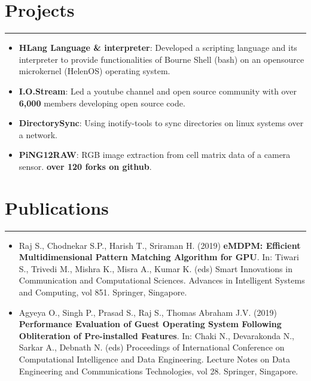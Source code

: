 \documentclass[a4paper,6pt]{article}
\begin{document}
\vspace{-9px}
\section*{Projects}
\vspace{-8px}
\hrule
\vspace{4px}
\hspace{5px}
\begin{itemize}
    \item \textbf{HLang Language \& interpreter}: \small Developed a scripting language and its interpreter to provide functionalities of Bourne Shell (bash) on an opensource microkernel (HelenOS) operating system.
\normalsize
\vspace{2px}
	\item \textbf{I.O.Stream}: \small Led a youtube channel and open source community with over \textcolor{mygray}{\textbf{6,000}} members developing open source code.
\vspace{2px}
\normalsize
	\item \textbf{DirectorySync}: \small Using inotify-tools to sync directories on linux systems over a network.
\vspace{2px}
\normalsize
	\item \textbf{PiNG12RAW}: \small RGB image extraction from cell matrix data of a camera sensor. \textcolor{mygray}{\textbf{over 120 forks on github}}. 
\normalsize
\end{itemize}

\vspace{-9px}
\section*{Publications}
\vspace{-8px}
\hrule
\vspace{8px}
\begin{itemize}
	\item \small Raj S., Chodnekar S.P., Harish T., Sriraman H. (2019) \textcolor{mygray}{\textbf{eMDPM: Efficient Multidimensional Pattern Matching Algorithm for GPU}}. In: Tiwari S., Trivedi M., Mishra K., Misra A., Kumar K. (eds) Smart Innovations in Communication and Computational Sciences. Advances in Intelligent Systems and Computing, vol 851. Springer, Singapore. 
\normalsize
\vspace{2px}
	\item \small Agyeya O., Singh P., Prasad S., Raj S., Thomas Abraham J.V. (2019) \textcolor{mygray}{\textbf{Performance Evaluation of Guest Operating System Following Obliteration of Pre-installed Features}}. In: Chaki N., Devarakonda N., Sarkar A., Debnath N. (eds) Proceedings of International Conference on Computational Intelligence and Data Engineering. Lecture Notes on Data Engineering and Communications Technologies, vol 28. Springer, Singapore.
\normalsize
\end{itemize}
\end{document}
